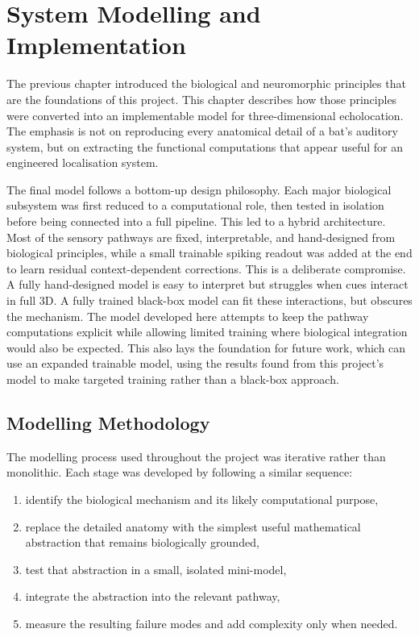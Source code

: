 \chapter{System Modelling and Implementation} \label{ch:modelling}

The previous chapter introduced the biological and neuromorphic principles that are the foundations of this project. This chapter describes how those principles were converted into an implementable model for three-dimensional echolocation. The emphasis is not on reproducing every anatomical detail of a bat's auditory system, but on extracting the functional computations that appear useful for an engineered localisation system.

The final model follows a bottom-up design philosophy. Each major biological subsystem was first reduced to a computational role, then tested in isolation before being connected into a full pipeline. This led to a hybrid architecture. Most of the sensory pathways are fixed, interpretable, and hand-designed from biological principles, while a small trainable spiking readout was added at the end to learn residual context-dependent corrections. This is a deliberate compromise. A fully hand-designed model is easy to interpret but struggles when cues interact in full 3D. A fully trained black-box model can fit these interactions, but obscures the mechanism. The model developed here attempts to keep the pathway computations explicit while allowing limited training where biological integration would also be expected. This also lays the foundation for future work, which can use an expanded trainable model, using the results found from this project's model to make targeted training rather than a black-box approach.

\section{Modelling Methodology}

The modelling process used throughout the project was iterative rather than monolithic. Each stage was developed by following a similar sequence:
\begin{enumerate}
    \item identify the biological mechanism and its likely computational purpose,
    \item replace the detailed anatomy with the simplest useful mathematical abstraction that remains biologically grounded,
    \item test that abstraction in a small, isolated mini-model,
    \item integrate the abstraction into the relevant pathway,
    \item measure the resulting failure modes and add complexity only when needed.
\end{enumerate}

